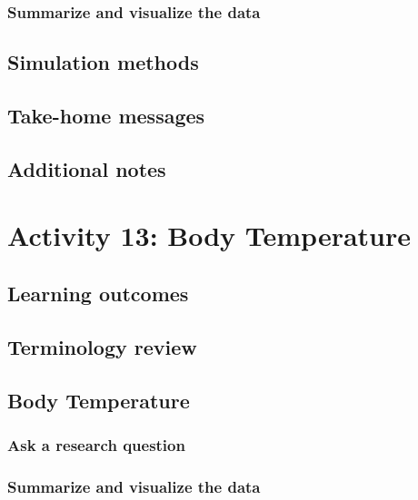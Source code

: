 \documentclass[
]{report}
\begin{document}
\subsubsection*{Summarize and visualize the data}\label{summarize-and-visualize-the-data-1}

\subsection*{Simulation methods}\label{simulation-methods}

\subsection{Take-home messages}\label{take-home-messages-11}

\subsection{Additional notes}\label{additional-notes-11}

\section{Activity 13: Body Temperature}\label{activity-13-body-temperature}

\subsection{Learning outcomes}\label{learning-outcomes-13}

\subsection{Terminology review}\label{terminology-review-11}

\subsection{Body Temperature}\label{body-temperature}

\subsubsection*{Ask a research question}\label{ask-a-research-question-2}

\subsubsection*{Summarize and visualize the data}\label{summarize-and-visualize-the-data-2}
\end{document}

